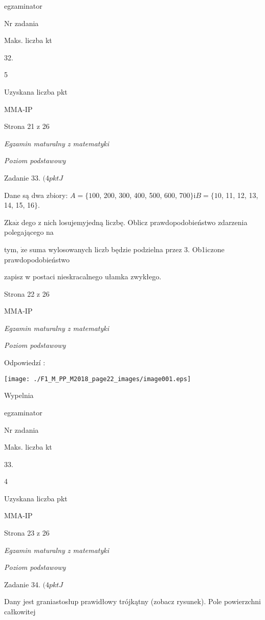 \documentclass[a4paper,12pt]{article}
\begin{document}
egzaminator

Nr zadania

Maks. liczba kt

32.

5

Uzyskana liczba pkt

MMA-IP

Strona 21 z 26





{\it Egzamin maturalny z matematyki}

{\it Poziom podstawowy}

Zadanie 33. $(4pktJ$

Dane są dwa zbiory: $A=\{100$, 200, 300, 400, 500, 600, 700$\} \mathrm{i} B=\{10$, 11, 12, 13, 14, 15, 16$\}.$

$\mathrm{Z}\mathrm{k}\mathrm{a}\dot{\mathrm{z}}$ dego z nich losujemyjedną liczbę. Oblicz prawdopodobieństwo zdarzenia polegającego na

tym, $\dot{\mathrm{z}}\mathrm{e}$ suma wylosowanych liczb będzie podzielna przez 3. Ob1iczone prawdopodobieństwo

zapisz w postaci nieskracalnego ułamka zwykłego.

Strona 22 z 26

MMA-IP





{\it Egzamin maturalny z matematyki}

{\it Poziom podstawowy}

Odpowiedzí :
\begin{center}
\texttt{[image: ./F1\_M\_PP\_M2018\_page22\_images/image001.eps]}
\end{center}
Wypelnia

egzaminator

Nr zadania

Maks. liczba kt

33.

4

Uzyskana liczba pkt

MMA-IP

Strona 23 z 26





{\it Egzamin maturalny z matematyki}

{\it Poziom podstawowy}

Zadanie 34. $(4pktJ$

Dany jest graniastosłup prawidłowy trójkątny (zobacz rysunek). Pole powierzchni całkowitej
\end{document}
